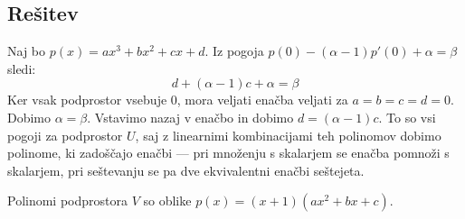 \documentclass[a4,11pt]{article}
\begin{document}
\subsection*{Rešitev}
    Naj bo \(p\left(x\right) = ax^3 + bx^2 + cx + d\).
    Iz pogoja \(p\left(0\right) - \left(\alpha - 1\right)p'\left(0\right) + \alpha = \beta\) sledi:
    \[
        d + \left(\alpha - 1\right)c + \alpha = \beta
    \]
    Ker vsak podprostor vsebuje \(0\), mora veljati enačba veljati za \(a = b = c = d = 0\).
    Dobimo \(\alpha = \beta\). Vstavimo nazaj v enačbo in dobimo \(d = \left(\alpha - 1\right)c\).
    To so vsi pogoji za podprostor \(U\), saj z linearnimi kombinacijami teh polinomov dobimo
    polinome, ki zadoščajo enačbi --- pri množenju s skalarjem se enačba pomnoži s skalarjem, 
    pri seštevanju se pa dve ekvivalentni enačbi seštejeta.

    Polinomi podprostora \(V\) so oblike 
    \(p\left(x\right) = \left(x + 1\right)\left(ax^2 + bx + c\right)\).
\end{document}
